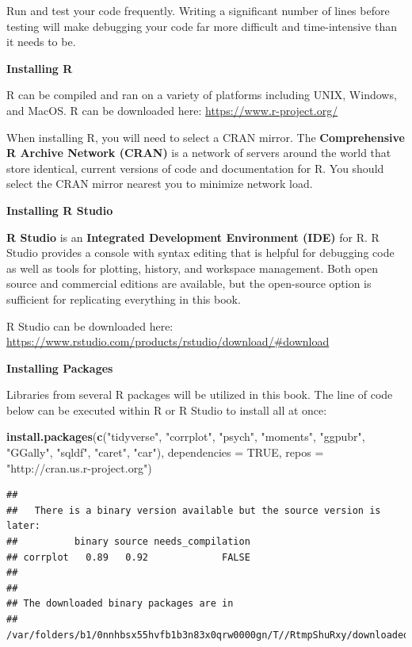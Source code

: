 \documentclass[]{book}
\newenvironment{Shaded}{\begin{snugshade}}{\end{snugshade}}
\newcommand{\DataTypeTok}[1]{\textcolor[rgb]{0.13,0.29,0.53}{#1}}
\newcommand{\KeywordTok}[1]{\textcolor[rgb]{0.13,0.29,0.53}{\textbf{#1}}}
\newcommand{\NormalTok}[1]{#1}
\newcommand{\OtherTok}[1]{\textcolor[rgb]{0.56,0.35,0.01}{#1}}
\newcommand{\StringTok}[1]{\textcolor[rgb]{0.31,0.60,0.02}{#1}}
\begin{document}
Run and test your code frequently. Writing a significant number of lines before testing will make debugging your code far more difficult and time-intensive than it needs to be.

\textbf{Installing R}

R can be compiled and ran on a variety of platforms including UNIX, Windows, and MacOS. R can be downloaded here: \url{https://www.r-project.org/}

When installing R, you will need to select a CRAN mirror. The \textbf{Comprehensive R Archive Network (CRAN)} is a network of servers around the world that store identical, current versions of code and documentation for R. You should select the CRAN mirror nearest you to minimize network load.

\textbf{Installing R Studio}

\textbf{R Studio} is an \textbf{Integrated Development Environment (IDE)} for R. R Studio provides a console with syntax editing that is helpful for debugging code as well as tools for plotting, history, and workspace management. Both open source and commercial editions are available, but the open-source option is sufficient for replicating everything in this book.

R Studio can be downloaded here: \url{https://www.rstudio.com/products/rstudio/download/\#download}

\textbf{Installing Packages}

Libraries from several R packages will be utilized in this book. The line of code below can be executed within R or R Studio to install all at once:

\begin{Shaded}
\begin{Highlighting}[]
\KeywordTok{install.packages}\NormalTok{(}\KeywordTok{c}\NormalTok{(}\StringTok{"tidyverse"}\NormalTok{, }\StringTok{"corrplot"}\NormalTok{, }\StringTok{"psych"}\NormalTok{, }\StringTok{"moments"}\NormalTok{, }\StringTok{"ggpubr"}\NormalTok{, }\StringTok{"GGally"}\NormalTok{, }\StringTok{"sqldf"}\NormalTok{, }\StringTok{"caret"}\NormalTok{, }\StringTok{"car"}\NormalTok{), }\DataTypeTok{dependencies =} \OtherTok{TRUE}\NormalTok{, }\DataTypeTok{repos =} \StringTok{"http://cran.us.r-project.org"}\NormalTok{)}
\end{Highlighting}
\end{Shaded}

\begin{verbatim}
## 
##   There is a binary version available but the source version is later:
##          binary source needs_compilation
## corrplot   0.89   0.92             FALSE
## 
## 
## The downloaded binary packages are in
##  /var/folders/b1/0nnhbsx55hvfb1b3n83x0qrw0000gn/T//RtmpShuRxy/downloaded_packages
\end{verbatim}
\end{document}
